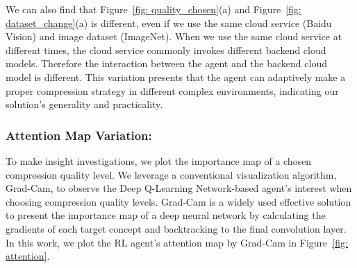 \textcolor{revise}{We can also find that Figure~\ref{fig: quality_chosen}(a) and Figure~\ref{fig: dataset_change}(a) is different, even if we use the same cloud service (Baidu Vision) and image dataset (ImageNet). When we use the same cloud service at different times, the cloud service commonly invokes different backend cloud models. Therefore the interaction between the agent and the backend cloud model is different. This variation presents that the agent can adaptively make a proper compression strategy in different complex environments, indicating our solution's generality and practicality.} %



\subsubsection{Attention Map Variation:}
\label{subsec: attention map}

To make insight investigations, we plot the importance map of a chosen compression quality level. We leverage a conventional visualization algorithm, Grad-Cam, to observe the Deep Q-Learning Network-based agent's interest when choosing compression quality levels. Grad-Cam is a widely used effective solution to present the importance map of a deep neural network by calculating the gradients of each target concept and backtracking to the final convolution layer. In this work, we plot the RL agent's attention map by Grad-Cam in Figure~\ref{fig: attention}. %

